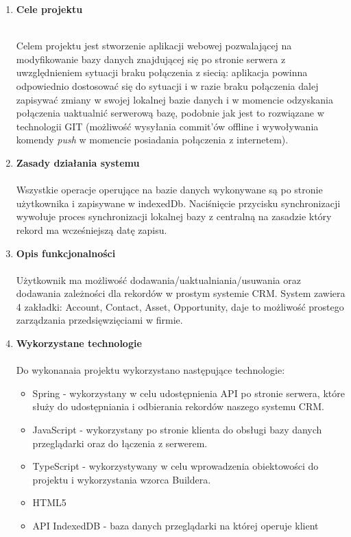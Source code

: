 \documentclass[a4paper,11pt]{article}
\begin{document}
\begin{enumerate}[leftmargin=0pt]
	\item \textbf{{\Large Cele projektu}}\\ \\
	\begin{large}
	\hspace*{1cm}
			Celem projektu jest stworzenie aplikacji webowej pozwalającej na modyfikowanie bazy danych znajdującej się po stronie serwera z uwzględnieniem sytuacji braku połączenia z siecią: aplikacja powinna odpowiednio dostosować się do sytuacji i w razie braku połączenia dalej zapisywać zmiany w swojej lokalnej bazie danych i w momencie odzyskania połączenia uaktualnić serwerową bazę, podobnie jak jest to rozwiązane w technologii GIT (możliwość wysyłania commit'ów offline i wywoływania komendy \textit{push} w momencie posiadania połączenia z internetem).

	
	\end{large}

	\item \textbf{{\Large Zasady działania systemu}}\\ \\
	\hspace*{1cm}
	Wszystkie operacje operujące na bazie danych wykonywane są po stronie użytkownika i zapisywane w indexedDb. Naciśnięcie przycisku synchronizacji wywołuje proces synchronizacji lokalnej bazy z centralną na zasadzie który rekord ma wcześniejszą datę zapisu. 
	
	\item \textbf{{\Large Opis funkcjonalności}}\\ \\
    \hspace*{1cm}
    Użytkownik ma możliwość dodawania/uaktualniania/usuwania oraz dodawania zależności dla rekordów w prostym systemie CRM. System zawiera 4 zakładki: Account, Contact, Asset, Opportunity, daje to możliwość prostego zarządzania przedsięwzięciami w firmie. 
    
    \item \textbf{{\Large Wykorzystane technologie}}\\ \\
    \hspace*{1cm}
    Do wykonanaia projektu wykorzystano następujące technologie:
    \begin{itemize}

    \item Spring - wykorzystany w celu udostępnienia API po stronie serwera, które służy do udostępniania i odbierania rekordów naszego systemu CRM.
    \item JavaScript - wykorzystany po stronie klienta do obsługi bazy danych przeglądarki oraz do łączenia z serwerem.
    \item TypeScript - wykorzystywany w celu wprowadzenia obiektowości do projektu i wykorzystania wzorca Buildera.
    \item HTML5
    \item API IndexedDB - baza danych przeglądarki na której operuje klient


\end{itemize}
\end{enumerate}
\end{document}
